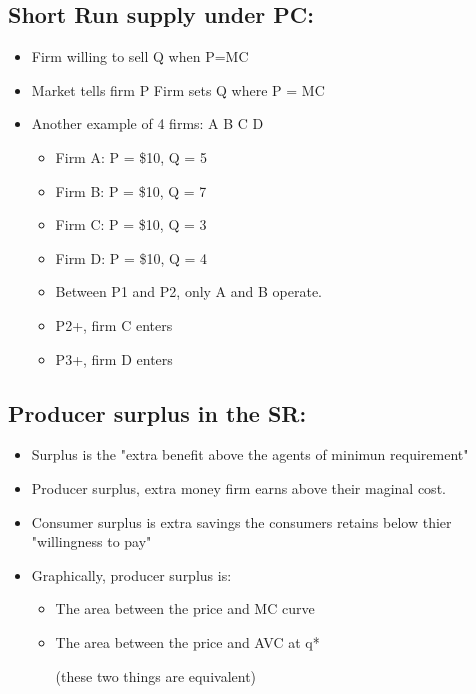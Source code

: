 \documentclass{article}
\begin{document}
\subsection{Short Run supply under PC:}
\begin{itemize}
  \item Firm willing to sell Q when P=MC
  \item Market tells firm P \Rightarrow{} Firm sets Q where P = MC
  \item Another example of 4 firms: A B C D
    \begin{itemize}
      \item Firm A: P = \$10, Q = 5
      \item Firm B: P = \$10, Q = 7
      \item Firm C: P = \$10, Q = 3
      \item Firm D: P = \$10, Q = 4
      \item Between P1 and P2, only A and B operate.
      \item P2+, firm C enters
      \item P3+, firm D enters
    \end{itemize}
\end{itemize}

\subsection{Producer surplus in the SR:}
\begin{itemize}
  \item Surplus is the "extra benefit above the agents of minimun requirement"
  \item Producer surplus, extra money firm earns above their maginal cost.
  \item Consumer surplus is extra savings the consumers retains below thier "willingness to pay"
  \item Graphically, producer surplus is:
    \begin{itemize}
      \item The area between the price and MC curve
      \item The area between the price and AVC at q*

        (these two things are equivalent)
    \end{itemize}
\end{itemize}
\end{document}
